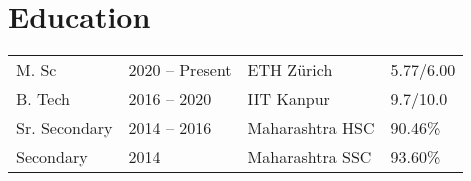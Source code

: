 \section*{Education}
\begin{tabulary}{\textwidth}{L L L L}

\toprule
{} &  &  & \\
\midrule
M. Sc & 2020 -- Present & ETH Zürich & 5.77/6.00\\%
B. Tech & 2016 -- 2020 & IIT Kanpur & 9.7/10.0\\%
Sr. Secondary & 2014 -- 2016 & Maharashtra HSC & 90.46\%\\%
Secondary & 2014 & Maharashtra SSC & 93.60\%\\
\bottomrule

\end{tabulary}

